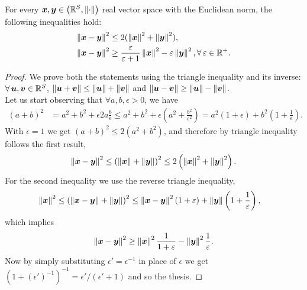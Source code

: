 \begin{lemma} \label{lem:norminequalities}
	For every $\bm{x}, \bm{y} \in \left(\mathbb{R}^S, \left\lVert\cdot\right\rVert\right)$ real vector space with the Euclidean norm, the following inequalities hold:
	\begin{align}
		\norm{\bm{x} - \bm{y}}^2 & \leq 2 (\norm{\bm{x}}^2 + \norm{\bm{y}}^2), \label{eq:ineqnormsqleq} \\
		\norm{\bm{x} - \bm{y}}^2 & \geq \frac{\epsilon}{\epsilon + 1} \norm{\bm{x}}^2 -\epsilon \norm{\bm{y}}^2, \forall \epsilon \in \real^+ \label{eq:ineqnormsqgeqeps}. 
	\end{align}
\end{lemma}
\begin{proof}
	We prove both the statements using the triangle inequality and its inverse: $\forall \bm{u}, \bm{v} \in \real^S$, $\left\lVert\bm{u} + \bm{v}\right\rVert \leq \left\lVert\bm{u}\right\rVert + \left\lVert\bm{v}\right\rVert$ and $\left\lVert\bm{u} - \bm{v}\right\rVert \geq \left\lVert\bm{u}\right\rVert - \left\lVert\bm{v}\right\rVert$. \\
	Let us start observing that $\forall a, b, \epsilon > 0$, we have
	\begin{equation*}
		\begin{aligned}
			(a + b)^2 & = a^2 + b^2 + \epsilon 2a \frac{b}{\epsilon} \leq a^2 + b^2 + \epsilon \left(a^2 + \frac{b^2}{\epsilon^2}\right) = a^2 \left(1 + \epsilon\right) + b^2 \left(1 + \frac{1}{\epsilon}\right).
		\end{aligned}
	\end{equation*}
	With $\epsilon = 1$ we get $(a + b)^2 \leq 2(a^2 + b^2)$, and therefore by triangle inequality  follows the first result,
	\begin{equation*}
		\left\lVert\bm{x} - \bm{y}\right\rVert^2 \leq \left(\left\lVert\bm{x}\right\rVert + \left\lVert\bm{y}\right\rVert\right)^2 \leq 2 \left(\left\lVert\bm{x}\right\rVert^2 + \left\lVert\bm{y}\right\rVert^2\right).
	\end{equation*}
	For the second inequality we use the reverse triangle inequality,
	\begin{equation*}
		\begin{aligned}
			\left\lVert\bm{x}\right\rVert^2 & \leq \left(\left\lVert\bm{x} - \bm{y}\right\rVert + \left\lVert\bm{y}\right\rVert\right)^2 \leq \left\lVert\bm{x} - \bm{y}\right\rVert^2 (1 + \varepsilon) + \left\lVert\bm{y}\right\rVert \left(1 + \frac{1}{\varepsilon}\right),
		\end{aligned}
	\end{equation*}
	which implies
	\begin{equation*}
		\left\lVert\bm{x} - \bm{y}\right\rVert^2 \geq \left\lVert\bm{x}\right\rVert^2 \frac{1}{1 + \varepsilon} - \left\lVert\bm{y}\right\rVert^2 \frac{1}{\varepsilon}.
	\end{equation*}
	Now by simply substituting $\epsilon' = \epsilon^{-1}$ in place of $\epsilon$ we get $(1 + (\epsilon')^{-1})^{-1} = \epsilon' / (\epsilon' + 1)$ and so the thesis.
\end{proof}

